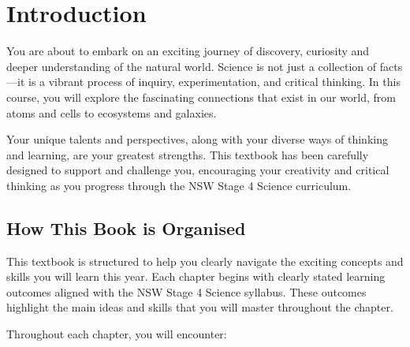 \chapter{Introduction}

 You are about to embark on an exciting journey of discovery, curiosity and deeper understanding of the natural world. Science is not just a collection of facts—it is a vibrant process of inquiry, experimentation, and critical thinking. In this course, you will explore the fascinating connections that exist in our world, from atoms and cells to ecosystems and galaxies.

Your unique talents and perspectives, along with your diverse ways of thinking and learning, are your greatest strengths. This textbook has been carefully designed to support and challenge you, encouraging your creativity and critical thinking as you progress through the NSW Stage 4 Science curriculum.

\section{How This Book is Organised}

This textbook is structured to help you clearly navigate the exciting concepts and skills you will learn this year. Each chapter begins with clearly stated learning outcomes aligned with the NSW Stage 4 Science syllabus. These outcomes highlight the main ideas and skills that you will master throughout the chapter.


Throughout each chapter, you will encounter:


